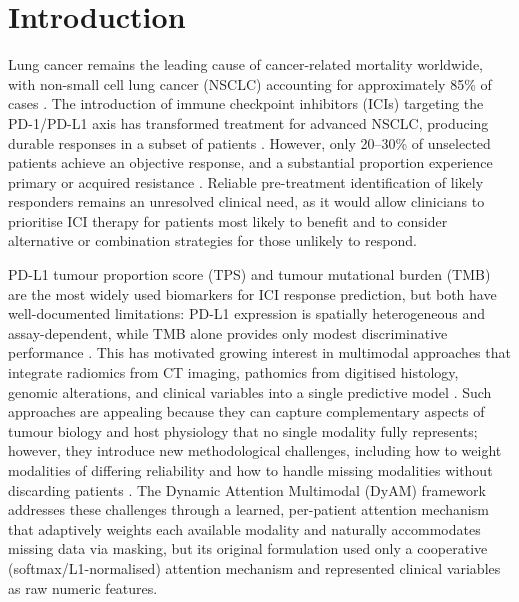 \section{Introduction}
\label{sec:intro}

Lung cancer remains the leading cause of cancer-related mortality worldwide,
with non-small cell lung cancer (NSCLC) accounting for approximately 85\% of
cases \cite{Siegel2024}.
The introduction of immune checkpoint inhibitors (ICIs) targeting the
PD-1/PD-L1 axis has transformed treatment for advanced NSCLC, producing
durable responses in a subset of patients \cite{Reck2016,Borghaei2015}.
However, only 20--30\% of unselected patients achieve an objective response,
and a substantial proportion experience primary or acquired resistance
\cite{Borghaei2015,Sharma2017}.
Reliable pre-treatment identification of likely responders remains an
unresolved clinical need, as it would allow clinicians to prioritise ICI
therapy for patients most likely to benefit and to consider alternative or
combination strategies for those unlikely to respond.

PD-L1 tumour proportion score (TPS) and tumour mutational burden (TMB) are
the most widely used biomarkers for ICI response prediction, but both have
well-documented limitations: PD-L1 expression is spatially heterogeneous and
assay-dependent, while TMB alone provides only modest discriminative
performance \cite{Herbst2016,Hirsch2017,Rizvi2015,Lu2019}.
This has motivated growing interest in multimodal approaches that integrate
radiomics from CT imaging, pathomics from digitised histology, genomic
alterations, and clinical variables into a single predictive model
\cite{Boehm2022,Bodalal2019,Dercle2020,Trebeschi2019,Cheerla2019}.
Such approaches are appealing because they can capture complementary aspects
of tumour biology and host physiology that no single modality fully
represents; however, they introduce new methodological challenges, including
how to weight modalities of differing reliability and how to handle missing
modalities without discarding patients \cite{Ma2021}.
The Dynamic Attention Multimodal (DyAM) framework
\cite{Vanguri2022} addresses these challenges through a learned, per-patient
attention mechanism that adaptively weights each available modality and
naturally accommodates missing data via masking, but its original
formulation used only a cooperative (softmax/L1-normalised) attention
mechanism and represented clinical variables as raw numeric features.

